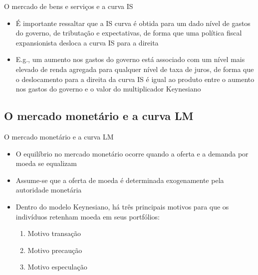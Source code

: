 \documentclass[10pt]{beamer}
\begin{document}
\begin{frame}{O mercado de bens e serviços e a curva IS}
    \begin{itemize}
        \item É importante ressaltar que a IS curva é obtida para um dado nível de gastos do governo, de tributação e expectativas, de forma que uma política fiscal expansionista desloca a curva IS para a direita
        \bigskip
        \item E.g., um aumento nos gastos do governo está associado com um nível mais elevado de renda agregada para qualquer nível de taxa de juros, de forma que o deslocamento para a direita da curva IS é igual ao produto entre o aumento nos gastos do governo e o valor do multiplicador Keynesiano
    \end{itemize}
\end{frame}

\subsection{O mercado monetário e a curva LM}
\begin{frame}{O mercado monetário e a curva LM}
    \begin{itemize}
        \item O equilíbrio no mercado monetário ocorre quando a oferta e a demanda por moeda se equalizam
        \bigskip
        \item Assume-se que a oferta de moeda é determinada exogenamente pela autoridade monetária
        \bigskip
        \item Dentro do modelo Keynesiano, há três principais motivos para que os indivíduos retenham moeda em seus portfólios:
        \bigskip
        \begin{enumerate}
            \item Motivo transação
            \medskip
            \item Motivo precaução
            \medskip
            \item Motivo especulação
        \end{enumerate}
    \end{itemize}
\end{frame}
\end{document}
